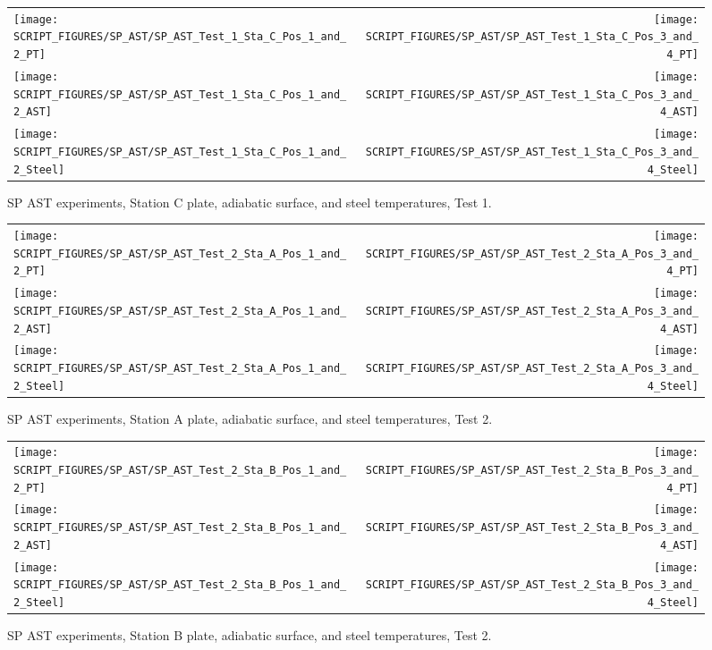 \begin{figure}[p]
\begin{tabular*}{\textwidth}{l@{\extracolsep{\fill}}r}
\texttt{[image: SCRIPT\_FIGURES/SP\_AST/SP\_AST\_Test\_1\_Sta\_C\_Pos\_1\_and\_2\_PT]} &
\texttt{[image: SCRIPT\_FIGURES/SP\_AST/SP\_AST\_Test\_1\_Sta\_C\_Pos\_3\_and\_4\_PT]} \\
\texttt{[image: SCRIPT\_FIGURES/SP\_AST/SP\_AST\_Test\_1\_Sta\_C\_Pos\_1\_and\_2\_AST]} &
\texttt{[image: SCRIPT\_FIGURES/SP\_AST/SP\_AST\_Test\_1\_Sta\_C\_Pos\_3\_and\_4\_AST]} \\
\texttt{[image: SCRIPT\_FIGURES/SP\_AST/SP\_AST\_Test\_1\_Sta\_C\_Pos\_1\_and\_2\_Steel]} &
\texttt{[image: SCRIPT\_FIGURES/SP\_AST/SP\_AST\_Test\_1\_Sta\_C\_Pos\_3\_and\_4\_Steel]}
\end{tabular*}
\caption{SP AST experiments, Station C plate, adiabatic surface, and steel temperatures, Test 1.}
\label{SP_Test_1_Station_C}
\end{figure}


\begin{figure}[p]
\begin{tabular*}{\textwidth}{l@{\extracolsep{\fill}}r}
\texttt{[image: SCRIPT\_FIGURES/SP\_AST/SP\_AST\_Test\_2\_Sta\_A\_Pos\_1\_and\_2\_PT]} &
\texttt{[image: SCRIPT\_FIGURES/SP\_AST/SP\_AST\_Test\_2\_Sta\_A\_Pos\_3\_and\_4\_PT]} \\
\texttt{[image: SCRIPT\_FIGURES/SP\_AST/SP\_AST\_Test\_2\_Sta\_A\_Pos\_1\_and\_2\_AST]} &
\texttt{[image: SCRIPT\_FIGURES/SP\_AST/SP\_AST\_Test\_2\_Sta\_A\_Pos\_3\_and\_4\_AST]} \\
\texttt{[image: SCRIPT\_FIGURES/SP\_AST/SP\_AST\_Test\_2\_Sta\_A\_Pos\_1\_and\_2\_Steel]} &
\texttt{[image: SCRIPT\_FIGURES/SP\_AST/SP\_AST\_Test\_2\_Sta\_A\_Pos\_3\_and\_4\_Steel]}
\end{tabular*}
\caption{SP AST experiments, Station A plate, adiabatic surface, and steel temperatures, Test 2.}
\label{SP_Test_2_Station_A}
\end{figure}

\begin{figure}[p]
\begin{tabular*}{\textwidth}{l@{\extracolsep{\fill}}r}
\texttt{[image: SCRIPT\_FIGURES/SP\_AST/SP\_AST\_Test\_2\_Sta\_B\_Pos\_1\_and\_2\_PT]} &
\texttt{[image: SCRIPT\_FIGURES/SP\_AST/SP\_AST\_Test\_2\_Sta\_B\_Pos\_3\_and\_4\_PT]} \\
\texttt{[image: SCRIPT\_FIGURES/SP\_AST/SP\_AST\_Test\_2\_Sta\_B\_Pos\_1\_and\_2\_AST]} &
\texttt{[image: SCRIPT\_FIGURES/SP\_AST/SP\_AST\_Test\_2\_Sta\_B\_Pos\_3\_and\_4\_AST]} \\
\texttt{[image: SCRIPT\_FIGURES/SP\_AST/SP\_AST\_Test\_2\_Sta\_B\_Pos\_1\_and\_2\_Steel]} &
\texttt{[image: SCRIPT\_FIGURES/SP\_AST/SP\_AST\_Test\_2\_Sta\_B\_Pos\_3\_and\_4\_Steel]}
\end{tabular*}
\caption{SP AST experiments, Station B plate, adiabatic surface, and steel temperatures, Test 2.}
\label{SP_Test_2_Station_B}
\end{figure}

